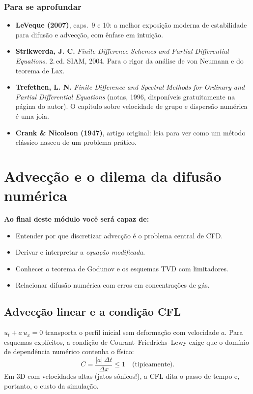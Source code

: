 \documentclass[10pt,a4paper,twocolumn,openany]{report}
\newenvironment{conceito}[1]{\section{#1}}{\par}
\newenvironment{aprofundar}{\subsection*{\textcolor{amarelo}{Para se aprofundar}}\small}{\par}
\newcommand{\objetivos}{\noindent\textbf{Ao final deste módulo você será capaz de:}}
\begin{document}
\begin{aprofundar}
\begin{itemize}[leftmargin=*]
  \item \textbf{LeVeque (2007)}, caps.\ 9 e 10: a melhor exposição moderna de estabilidade para difusão e advecção, com ênfase em intuição.
  \item \textbf{Strikwerda, J. C.} \emph{Finite Difference Schemes and Partial Differential Equations}. 2.\,ed. SIAM, 2004. Para o rigor da análise de von Neumann e do teorema de Lax.
  \item \textbf{Trefethen, L. N.} \emph{Finite Difference and Spectral Methods for Ordinary and Partial Differential Equations} (notas, 1996, disponíveis gratuitamente na página do autor). O capítulo sobre velocidade de grupo e dispersão numérica é uma joia.
  \item \textbf{Crank \& Nicolson (1947)}, artigo original: leia para ver como um método clássico nasceu de um problema prático.
\end{itemize}
\end{aprofundar}

\chapter{Advecção e o dilema da difusão numérica}

\objetivos
\begin{itemize}
  \item Entender por que discretizar advecção é o problema central de CFD.
  \item Derivar e interpretar a \emph{equação modificada}.
  \item Conhecer o teorema de Godunov e os esquemas TVD com limitadores.
  \item Relacionar difusão numérica com erros em concentrações de gás.
\end{itemize}

\begin{conceito}{Advecção linear e a condição CFL}
$u_t + a\,u_x = 0$ transporta o perfil inicial sem deformação com velocidade
$a$. Para esquemas explícitos, a condição de Courant--Friedrichs--Lewy exige
que o domínio de dependência numérico contenha o físico:
\[
  C = \frac{|a|\,\Delta t}{\Delta x} \le 1 \quad\text{(tipicamente).}
\]
Em 3D com velocidades altas (jatos sônicos!), a CFL dita o passo de tempo e,
portanto, o custo da simulação.
\end{conceito}
\end{document}
